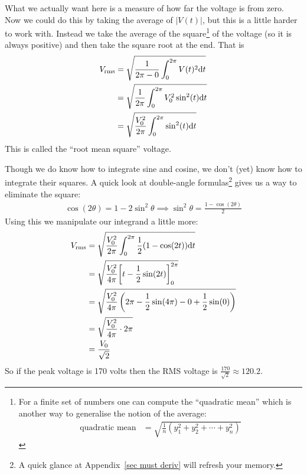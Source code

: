 \begin{eg}
What we actually want here is a measure of how far the voltage is from zero. Now we could
do this by taking the average of $|V(t)|$, but this is a little harder to work with.
Instead we take the average of the square\footnote{For a finite
set of numbers one can compute the ``quadratic mean'' which is another way to generalise
the notion of the average:
\begin{align*}
  \text{quadratic mean}
&= \sqrt{\frac{1}{n}\left(y_1^2 + y_2^2 + \cdots + y_n^2 \right) }
\end{align*}
} of the voltage (so it is always positive) and then take the square root at the
end. That is
\begin{align*}
  V_\mathrm{rms}
  &= \sqrt{\frac{1}{2\pi-0} \int_0^{2\pi} V(t)^2 \mathrm{d}t}\\
  &= \sqrt{\frac{1}{2\pi} \int_0^{2\pi} V_0^2 \sin^2(t) \mathrm{d}t}\\
  &= \sqrt{\frac{V_0^2}{2\pi} \int_0^{2\pi} \sin^2(t) \mathrm{d}t}
\end{align*}
This is called the ``root mean square'' voltage.

Though we do know how to integrate sine and cosine, we don't (yet) know how to integrate
their squares. A quick look at double-angle formulas\footnote{A quick glance at
Appendix~\ref{sec must deriv} will refresh your memory.} gives us a way to eliminate the
square:
\begin{align*}
  \cos(2\theta) =1-2\sin^2\theta \implies \sin^2\theta=\frac{1-\cos(2\theta)}{2}
\end{align*}
Using this we manipulate our integrand a little more:
\begin{align*}
V_\mathrm{rms} &= \sqrt{\frac{V_0^2}{2\pi} \int_0^{2\pi}
\frac{1}{2}(1-\cos(2t)) \mathrm{d}t}\\
&= \sqrt{
\frac{V_0^2}{4\pi}
\bigg[t - \frac{1}{2}\sin(2t)  \bigg]_0^{2\pi}
}\\
&= \sqrt{
\frac{V_0^2}{4\pi} \left(2\pi - \frac{1}{2}\sin(4\pi) - 0 + \frac{1}{2}\sin(0) \right)
}\\
&= \sqrt{
\frac{V_0^2}{4\pi} \cdot 2\pi
}\\
&= \frac{V_0}{\sqrt{2}}
\end{align*}
So if the peak voltage is 170 volts then the RMS voltage is $\frac{170}{\sqrt{2}}\approx
120.2$.
\end{eg}


